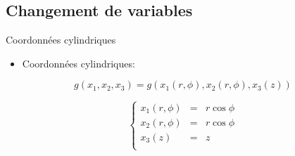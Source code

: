 \documentclass[french]{beamer}
\begin{document}
\subsection{Changement de variables} 
\begin{frame}{Coordonnées cylindriques}
  \begin{minipage}{0.48\textwidth}
  
   \begin{itemize}
       \item Coordonnées cylindriques: \\
    \end{itemize}
$$g(x_1, x_2, x_3) = g(x_1(r, \phi), x_2(r, \phi), x_3(z))$$  

      \begin{equation}
	\left \{
	  \begin{array}{ccc}
	    x_1(r, \phi) &=& r \cos \phi  \\
	    x_2(r, \phi) & = & r \cos \phi   \\
	    x_3(z) & = & z \\
	  \end{array}
	  \right.
	\end{equation}
	
    \end{minipage}
    \begin{minipage}{0.48\textwidth}
   
      \end{minipage}
      \pause
    \vspace{23pt}

\end{frame}
\end{document}
